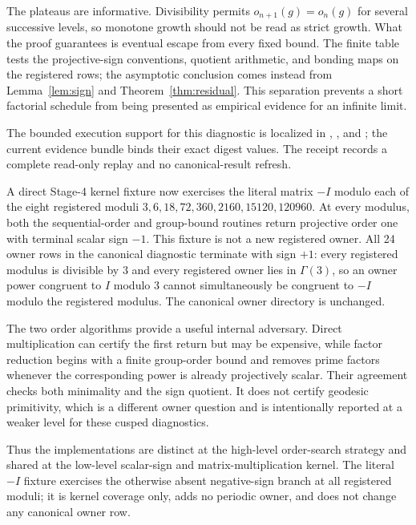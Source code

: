 \documentclass[11pt]{article}
\theoremstyle{definition}
\theoremstyle{remark}
\begin{document}
The plateaus are informative. Divisibility permits $o_{n+1}(g)=o_n(g)$ for several successive levels, so monotone growth should not be read as strict growth. What the proof guarantees is eventual escape from every fixed bound. The finite table tests the projective-sign conventions, quotient arithmetic, and bonding maps on the registered rows; the asymptotic conclusion comes instead from Lemma~\ref{lem:sign} and Theorem~\ref{thm:residual}. This separation prevents a short factorial schedule from being presented as empirical evidence for an infinite limit.

The bounded execution support for this diagnostic is localized in , , and ; the current evidence bundle binds their exact digest values. The receipt records a complete read-only replay and no canonical-result refresh.

A direct Stage-4 kernel fixture now exercises the literal matrix $-I$ modulo each of the eight registered moduli $3,6,18,72,360,2160,15120,120960$. At every modulus, both the sequential-order and group-bound routines return projective order one with terminal scalar sign $-1$. This fixture is not a new registered owner. All 24 owner rows in the canonical diagnostic terminate with sign $+1$: every registered modulus is divisible by $3$ and every registered owner lies in $\Gamma(3)$, so an owner power congruent to $I$ modulo $3$ cannot simultaneously be congruent to $-I$ modulo the registered modulus. The canonical owner directory is unchanged.

The two order algorithms provide a useful internal adversary. Direct multiplication can certify the first return but may be expensive, while factor reduction begins with a finite group-order bound and removes prime factors whenever the corresponding power is already projectively scalar. Their agreement checks both minimality and the sign quotient. It does not certify geodesic primitivity, which is a different owner question and is intentionally reported at a weaker level for these cusped diagnostics.

Thus the implementations are distinct at the high-level order-search strategy and shared at the low-level scalar-sign and matrix-multiplication kernel. The literal $-I$ fixture exercises the otherwise absent negative-sign branch at all registered moduli; it is kernel coverage only, adds no periodic owner, and does not change any canonical owner row.
\end{document}
